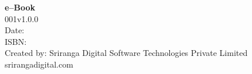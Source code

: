 \thispagestyle{empty}

 \textbf{e–Book}\\
 001v1.0.0\\
 Date: \\
 ISBN: \\
 Created by: Sriranga Digital Software Technologies Private Limited\\srirangadigital.com


